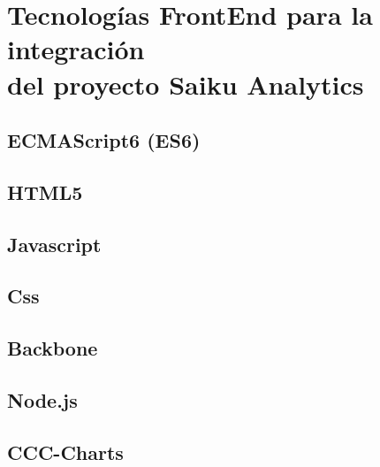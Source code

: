 \section{Tecnolog\'{i}as FrontEnd para la integraci\'{o}n\\
		 del proyecto Saiku Analytics}
		\lipsum[1-2]
	\subsection{ECMAScript6 (ES6)}
			\lipsum[1-2]
	\subsection{HTML5}
			\lipsum[1-2]
	\subsection{Javascript}
			\lipsum[1-2]
	\subsection{Css}
			\lipsum[1-2]
	\subsection{Backbone}
			\lipsum[1-2]
	\subsection{Node.js}
			\lipsum[1-2]
	\subsection{CCC-Charts}
			\lipsum[1-2]

		
		
		
		
